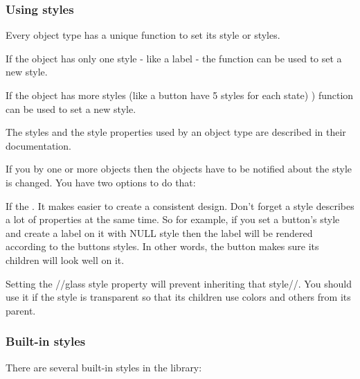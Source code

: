 \documentclass[letterpaper,10pt,english]{sphinxmanual}
\begin{document}
\subsubsection{Using styles}
\label{\detokenize{overview/styles:using-styles}}
Every object type has a unique function to set its style or styles.

If the object has only one style - like a label - the function can be used to set a new style.

If the object has more styles (like a button have 5 styles for each state) ) function can be used to set a new style.

The styles and the style properties used by an object type are described in their documentation.

If you  by one or more objects then the objects have to be notified about the style is changed. You have two options to do that:

%
\begin{sphinxVerbatim}[commandchars=\\\{\}]
   		
   		
\end{sphinxVerbatim}

If the . It makes easier to create a consistent design. Don’t forget a style describes a lot of properties at the same time. So for example, if you set a button’s style and create a label on it with NULL style then the label will be rendered according to the buttons styles. In other words, the button makes sure its children will look well on it.

Setting the //glass style property will prevent inheriting that style//. You should use it if the style is transparent so that its children use colors and others from its parent.


\subsubsection{Built-in styles}
\label{\detokenize{overview/styles:built-in-styles}}
There are several built-in styles in the library:
\end{document}
